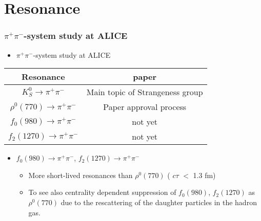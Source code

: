 
\section{Resonance}

\begin{frame}
\frametitle{$\pi^{+}\pi^{-}$-system study at ALICE}
\begin{itemize}
	\item{$\pi^{+}\pi^{-}$-system study at ALICE}
\end{itemize}
\begin{table}[htp]
\begin{center}
\begin{tabular}{|c|c|}
\hline
Resonance  & paper\\
\hline
$K^0_{S} \rightarrow \pi^{+}\pi^{-}$ & Main topic of Strangeness group\\
$\rho^0(770) \rightarrow \pi^{+}\pi^{-}$ & Paper approval process \footnotemark\\
$f_0(980) \rightarrow \pi^{+}\pi^{-}$ & not yet \\
$f_2(1270) \rightarrow \pi^{+}\pi^{-}$ & not yet \\
\hline
\end{tabular}
\end{center}
\label{default}
\end{table}%

\begin{itemize}
	\item{$f_0(980) \rightarrow \pi^{+}\pi^{-}$, $f_2(1270) \rightarrow \pi^{+}\pi^{-}$}
	\begin{itemize}
		\item{More short-lived resonances than $\rho^0(770)$ ( $ c\tau$  $<$ 1.3 fm)}
		\item{To see also centrality dependent suppression of $f_0(980)$, $f_2(1270)$ as  $\rho^0(770)$ due to the rescattering of the daughter particles in the hadron gas.}
	\end{itemize}

\end{itemize}

\end{frame}

